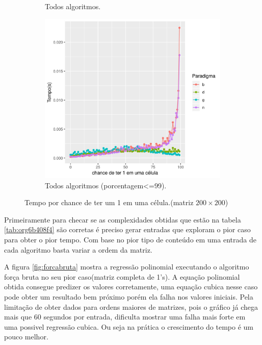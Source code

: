 \documentclass[10.9pt]{article}
\begin{document}
\begin{center}
\begin{figure}
\begin{subfigure}[b]{.3\textwidth}
\caption{Todos algoritmos.}\label{fig:tempo-rand-b}
\end{subfigure}
\begin{subfigure}[b]{.3\textwidth}
\centering
\includegraphics[width=1\textwidth]{tempo-rand-c}
\caption{Todos algoritmos (porcentagem<=99).}\label{fig:tempo-rand-c}
\end{subfigure}

\caption{Tempo por chance de ter um 1 em uma célula.(matriz $200\times 200$)}\label{fig:tempo-rand}
\end{figure}
\end{center}

Primeiramente para checar se as complexidades obtidas que estão na tabela \ref{tab:org6b408f4} são corretas é preciso gerar entradas que exploram o pior caso para obter o pior tempo. Com base no pior tipo de conteúdo em uma entrada de cada algoritmo basta variar a ordem da matriz.

A figura \ref{fig:forcabruta} mostra a regressão polinomial executando o algoritmo força bruta no seu pior caso(matriz completa de 1's). A equação polinomial obtida consegue predizer os valores corretamente, uma equação cubica nesse caso pode obter um resultado bem próximo porém ela falha nos valores iniciais. Pela limitação de obter dados para ordens maiores de matrizes, pois o gráfico já chega mais que 60 segundos por entrada, dificulta mostrar uma falha mais forte em uma possivel regressão cubica. Ou seja na prática o crescimento do tempo é um pouco melhor.
\end{document}
